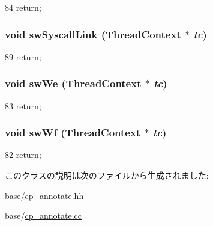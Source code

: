 \begin{DoxyCode}
84 { return; }
\end{DoxyCode}
\hypertarget{classCPA_ae18020f070546bb9bc4f695bd55670be}{
\subsubsection[{swSyscallLink}]{\setlength{\rightskip}{0pt plus 5cm}void swSyscallLink ({\bf ThreadContext} $\ast$ {\em tc})}}
\label{classCPA_ae18020f070546bb9bc4f695bd55670be}



\begin{DoxyCode}
89 { return; }
\end{DoxyCode}
\hypertarget{classCPA_a0e6dd13c9f0caea571fa9eaabf785f60}{
\subsubsection[{swWe}]{\setlength{\rightskip}{0pt plus 5cm}void swWe ({\bf ThreadContext} $\ast$ {\em tc})}}
\label{classCPA_a0e6dd13c9f0caea571fa9eaabf785f60}



\begin{DoxyCode}
83 { return; }
\end{DoxyCode}
\hypertarget{classCPA_aca9bb707d81369735abc9ed6f1a7149a}{
\subsubsection[{swWf}]{\setlength{\rightskip}{0pt plus 5cm}void swWf ({\bf ThreadContext} $\ast$ {\em tc})}}
\label{classCPA_aca9bb707d81369735abc9ed6f1a7149a}



\begin{DoxyCode}
82 { return; }
\end{DoxyCode}


このクラスの説明は次のファイルから生成されました:\begin{DoxyCompactItemize}
\item 
base/\hyperlink{cp__annotate_8hh}{cp\_\-annotate.hh}\item 
base/\hyperlink{cp__annotate_8cc}{cp\_\-annotate.cc}\end{DoxyCompactItemize}
